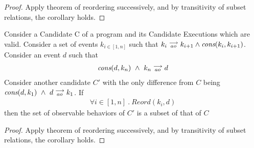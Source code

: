 \begin{proof}
    Apply theorem of reordering successively, and by transitivity of subset relations, the corollary holds.
\end{proof}

\begin{corollary}
    \label{CorollCodeMotion2}
    Consider a Candidate C of a program and its Candidate Executions which are valid. Consider a set of events $k_{i \in[1,n]}$ such that $k_i\stackrel{\longrightarrow}{_{ao}}k_{i+1} \wedge \textit{cons}(k_i,k_{i+1})$.
    Consider an event $d$ such that 
    \begin{align*}
        \textit{cons}(d,k_n) \ \wedge \ k_n\stackrel{\longrightarrow}{_{ao}}d  
    \end{align*}
    Consider another candidate $C'$ with the only difference from $C$ being $\cons{d}{k_1} \ \wedge \ \reln{d}{ao}{k_1}$.
    If 
    \begin{align*}
        \forall i \in [1,n] \ . \ Reord(k_i,d)
    \end{align*} 
    then the set of observable behaviors of $C'$ is a subset of that of $C$ 
\end{corollary}

\begin{proof}
    Apply theorem of reordering successively, and by transitivity of subset relations, the corollary holds.
\end{proof}

